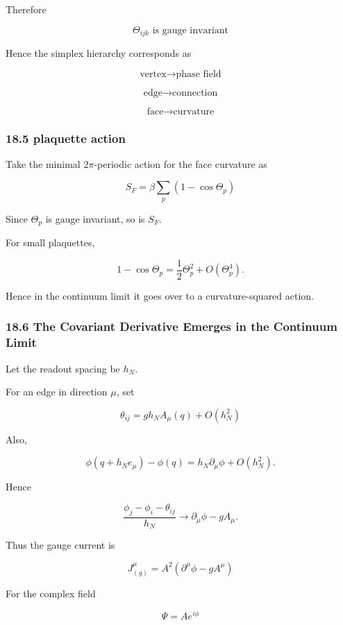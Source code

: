\documentclass[
  a4paper,
]{article}
\begin{document}
Therefore

\[
\boxed{
\Theta_{ijk}
\text{ is gauge invariant}
}
\tag{78}
\]

Hence the simplex hierarchy corresponds as

\[
\boxed{
\text{vertex}
\to
\text{phase field}
}
\]

\[
\boxed{
\text{edge}
\to
\text{connection}
}
\]

\[
\boxed{
\text{face}
\to
\text{curvature}
}
\tag{79}
\]

\subsubsection{18.5 plaquette action}\label{plaquette-action}

Take the minimal \(2\pi\)-periodic action for the face curvature as

\[
\boxed{
S_F
=
\beta
\sum_p
\left(
1-\cos\Theta_p
\right)
}
\tag{80}
\]

Since \(\Theta_p\) is gauge invariant, so is \(S_F\).

For small plaquettes,

\[
1-\cos\Theta_p
=
\frac12\Theta_p^2
+
O(\Theta_p^4).
\tag{81}
\]

Hence in the continuum limit it goes over to a curvature-squared action.

\subsubsection{18.6 The Covariant Derivative Emerges in the Continuum
Limit}\label{the-covariant-derivative-emerges-in-the-continuum-limit}

Let the readout spacing be \(h_N\).

For an edge in direction \(\mu\), set

\[
\theta_{ij}
=
gh_NA_\mu(q)
+
O(h_N^2)
\tag{82}
\]

Also,

\[
\phi(q+h_Ne_\mu)-\phi(q)
=
h_N\partial_\mu\phi
+
O(h_N^2).
\]

Hence

\[
\frac{
\phi_j-\phi_i-\theta_{ij}
}{
h_N
}
\longrightarrow
\partial_\mu\phi-gA_\mu.
\]

Thus the gauge current is

\[
\boxed{
J^\mu_{(g)}
=
A^2
\left(
\partial^\mu\phi
-
gA^\mu
\right)
}
\tag{83}
\]

For the complex field

\[
\Psi=Ae^{i\phi}
\]
\end{document}
